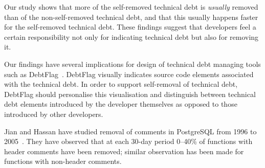 
Our study shows that more of the self-removed technical debt is \emph{usually} removed than of the non-self-removed technical debt,
and that this usually happens faster for the self-removed technical debt.
These findings suggest that developers feel a certain responsibility not only for indicating technical debt but also for removing it.

Our findings have several implications for design of technical debt managing tools such as DebtFlag~\cite{Holvitie:Leppanen}.
DebtFlag visually indicates source code elements associated with the technical debt.
In order to support self-removal of technical debt, DebtFlag should personalise this visualisation and distinguish 
between technical debt elements introduced by the developer themselves as opposed to those introduced by other developers.


Jian and Hassan have studied removal of comments in PostgreSQL from 1996 to 2005~\cite{Jiang:Hassan}. They have observed that at each 30-day period 0--40\% of functions with header comments have been removed; similar observation has been made for functions with non-header comments. 
